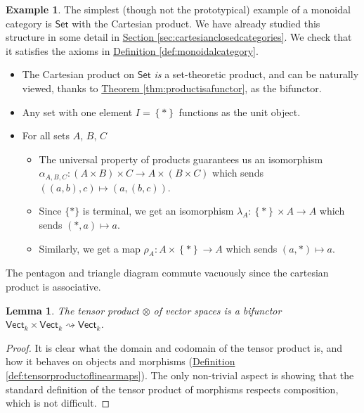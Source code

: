 \documentclass[a4paper,10pt]{scrreprt}
\theoremstyle{definition}
\newtheorem{example}{Example}[section]
\theoremstyle{plain}
\newtheorem{lemma}{Lemma}[section]
\theoremstyle{remark}
\begin{document}
\begin{example}
  \label{eg:setisamonoidalcategory}
  The simplest (though not the prototypical) example of a monoidal category is $\mathsf{Set}$ with the Cartesian product. We have already studied this structure in some detail in \hyperref[sec:cartesianclosedcategories]{Section \ref*{sec:cartesianclosedcategories}}. We check that it satisfies the axioms in \hyperref[def:monoidalcategory]{Definition \ref*{def:monoidalcategory}}.

  \begin{itemize}
    \item The Cartesian product on $\mathsf{Set}$ \emph{is} a set-theoretic product, and can be naturally viewed, thanks to \hyperref[thm:productisafunctor]{Theorem \ref*{thm:productisafunctor}}, as the bifunctor.

    \item Any set with one element $I = \left\{ * \right\}$ functions as the unit object.

    \item For all sets $A$, $B$, $C$
      \begin{itemize}
        \item The universal property of products guarantees us an isomorphism $\alpha_{A,B,C}\colon (A \times B) \times C \to A \times (B \times C)$ which sends $((a,b),c) \mapsto (a,(b,c))$.

        \item Since $\{*\}$ is terminal, we get an isomorphism $\lambda_{A}\colon \left\{ * \right\}\times A \to A$ which sends $(*,a) \mapsto a$.

        \item Similarly, we get a map $\rho_{A}\colon A \times\left\{ * \right\} \to A$ which sends $(a, *) \mapsto a$.
      \end{itemize}
  \end{itemize}

  The pentagon and triangle diagram commute vacuously since the cartesian product is associative.
\end{example}

\begin{lemma}
  The tensor product $\otimes$ of vector spaces is a bifunctor $\mathsf{Vect}_{k} \times \mathsf{Ve ct}_{k} \rightsquigarrow \mathsf{Vect}_{k}$.
\end{lemma}
\begin{proof}
  It is clear what the domain and codomain of the tensor product is, and how it behaves on objects and morphisms (\hyperref[def:tensorproductoflinearmaps]{Definition \ref*{def:tensorproductoflinearmaps}}). The only non-trivial aspect is showing that the standard definition of the tensor product of morphisms respects composition, which is not difficult.
\end{proof}
\end{document}
